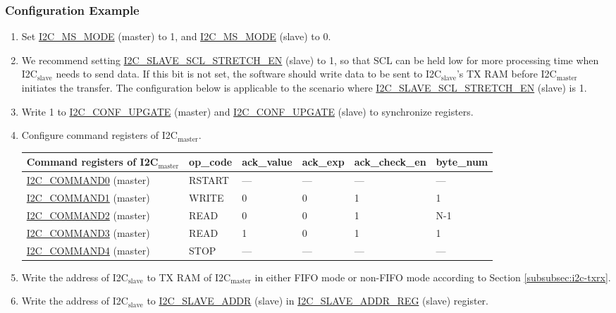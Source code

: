 \documentclass[main\_\_EN.tex]{subfiles}
\begin{document}
\subsubsection{Configuration Example}
\begin{enumerate}
\item Set \hyperref[fielddesc:I2CMSMODE]{I2C\_MS\_MODE} (master) to 1, and \hyperref[fielddesc:I2CMSMODE]{I2C\_MS\_MODE} (slave) to 0.
\item We recommend setting \hyperref[fielddesc:I2CSLAVESCLSTRETCHEN]{I2C\_SLAVE\_SCL\_STRETCH\_EN} (slave) to 1, so that SCL can be held low for more processing time when I2C$_\text{slave}$ needs to send data. If this bit is not set, the software should write data to be sent to I2C$_\text{slave}$'s TX RAM before I2C$_\text{master}$ initiates the transfer. The configuration below is applicable to the scenario where \hyperref[fielddesc:I2CSLAVESCLSTRETCHEN]{I2C\_SLAVE\_SCL\_STRETCH\_EN} (slave) is 1.
\item Write 1 to \hyperref[fielddesc:I2CCONFUPGATE]{I2C\_CONF\_UPGATE} (master) and \hyperref[fielddesc:I2CCONFUPGATE]{I2C\_CONF\_UPGATE} (slave) to synchronize registers.
\item Configure command registers of I2C$_\text{master}$.
\begin{longtable}{ | p{4cm} | p{2cm} | p{2cm} | p{2cm} |p{2cm} | p{2cm} |}
\hline\rowcolor{lightgray}
Command registers of I2C$_\text{master}$& op\_code & ack\_value&ack\_exp&ack\_check\_en&byte\_num  \\ \hline
\hyperref[fielddesc:I2CCOMMAND0]{I2C\_COMMAND0} (master)& RSTART& ---&---&---&---  \\ \hline
\hyperref[fielddesc:I2CCOMMAND1]{I2C\_COMMAND1} (master)& WRITE& 0&0&1&1  \\ \hline
\hyperref[fielddesc:I2CCOMMAND2]{I2C\_COMMAND2} (master)& READ& 0&0&1&N-1  \\ \hline
\hyperref[fielddesc:I2CCOMMAND3]{I2C\_COMMAND3} (master)& READ& 1&0&1&1  \\ \hline
\hyperref[fielddesc:I2CCOMMAND4]{I2C\_COMMAND4} (master)& STOP& ---&---&---&---  \\ \hline
\end{longtable}
\item Write the address of I2C$_\text{slave}$ to TX RAM of I2C$_\text{master}$ in either FIFO mode or non-FIFO mode according to Section \ref{subsubsec:i2c-txrx}.
\item Write the address of I2C$_\text{slave}$ to \hyperref[fielddesc:I2CSLAVEADDR]{I2C\_SLAVE\_ADDR} (slave) in \hyperref[regdesc:I2CSLAVEADDRREG]{I2C\_SLAVE\_ADDR\_REG} (slave) register.

\end{enumerate}
\end{document}
